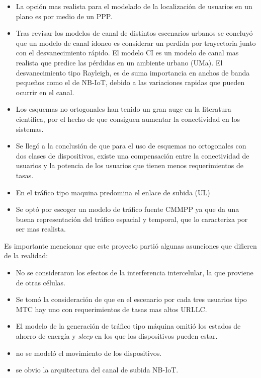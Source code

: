 \begin{itemize}
    \item La opción mas realista para el modelado de la localización de usuarios en un plano es por medio de un PPP.
  \item Tras revisar los modelos de canal de distintos escenarios urbanos se concluyó que un modelo de canal idoneo es considerar un perdida por trayectoria junto con el desvanecimiento rápido.  El modelo CI es un modelo de canal mas realista que predice las pérdidas en un ambiente urbano (UMa). El desvanecimiento tipo Rayleigh, es de suma importancia en anchos de banda pequeños como el de NB-IoT, debido a las variaciones rapidas que pueden ocurrir en el canal.
    \item Los esquemas no ortogonales han tenido un gran auge en la literatura cientifica, por el hecho de que consiguen aumentar la conectividad en los sistemas.
    \item Se llegó a la conclusión de que para el uso de esquemas no ortogonales con dos clases de dispositivos, existe una compensación entre la conectividad de usuarios y la potencia de los usuarios que tienen menos requerimientos de tasas.
    \item En el tráfico tipo maquina predomina el enlace de subida (UL)
    \item Se optó por escoger un modelo de tráfico fuente CMMPP ya que da una buena representación del tráfico espacial y temporal, que lo caracteriza por ser mas realista.
\end{itemize}


Es importante mencionar que este proyecto partió algunas asunciones que  difieren de la realidad:
\begin{itemize}
    \item No se consideraron los efectos de la interferencia intercelular, la que proviene de otras células. 
    \item Se tomó la consideración de que en el escenario por cada tres usuarios tipo MTC hay uno con requerimientos de tasas mas altos URLLC.
    \item El modelo de la generación de tráfico tipo máquina omitió los estados de ahorro de energía y \textit{sleep} en los que los dispositivos pueden estar.
    \item no se modeló el movimiento de los dispositivos.
    \item se obvio la arquitectura del canal de subida NB-IoT.
\end{itemize}

